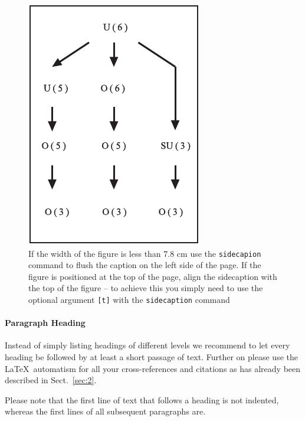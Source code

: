 %
\begin{figure}[b] %
\sidecaption
\includegraphics[scale=.65]{figure}
%
%
\caption{If the width of the figure is less than 7.8 cm use the \texttt{sidecapion} command to flush the caption on the left side of the page. If the figure is positioned at the top of the page, align the sidecaption with the top of the figure -- to achieve this you simply need to use the optional argument \texttt{[t]} with the \texttt{sidecaption} command}
\label{fig:1}       %
\end{figure}


\paragraph{Paragraph Heading} %
Instead of simply listing headings of different levels we recommend to
let every heading be followed by at least a short passage of text.
Further on please use the \LaTeX\ automatism for all your
cross-references and citations as has already been described in
Sect.~\ref{sec:2}.

Please note that the first line of text that follows a heading is not indented, whereas the first lines of all subsequent paragraphs are.

